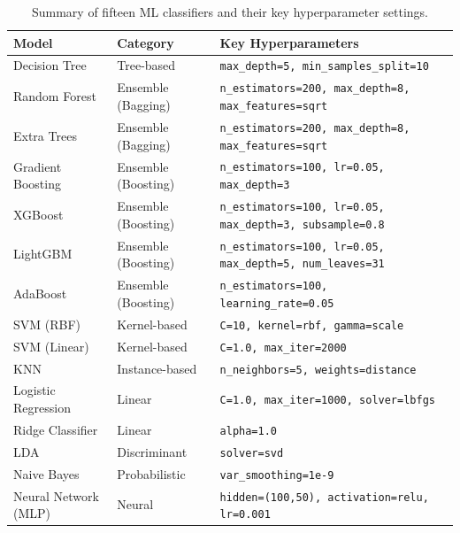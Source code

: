 \documentclass[12pt, oneside]{article} %
\begin{document}
\begin{table}[H]
\caption{Summary of fifteen ML classifiers and their key hyperparameter settings.}
\label{tab:classifiers}
\vspace{-4mm}
\begin{center}
\begin{tabular}{|>{\raggedright\arraybackslash}p{3.8cm}|>{\raggedright\arraybackslash}p{2.8cm}|>{\raggedright\arraybackslash}p{6.0cm}|}
\hline
\textbf{Model} & \textbf{Category} & \textbf{Key Hyperparameters} \\
\hline
Decision Tree & Tree-based & \texttt{max\_depth=5, min\_samples\_split=10} \\
\hline
Random Forest & Ensemble (Bagging) & \texttt{n\_estimators=200, max\_depth=8, max\_features=sqrt} \\
\hline
Extra Trees & Ensemble (Bagging) & \texttt{n\_estimators=200, max\_depth=8, max\_features=sqrt} \\
\hline
Gradient Boosting & Ensemble (Boosting) & \texttt{n\_estimators=100, lr=0.05, max\_depth=3} \\
\hline
XGBoost & Ensemble (Boosting) & \texttt{n\_estimators=100, lr=0.05, max\_depth=3, subsample=0.8} \\
\hline
LightGBM & Ensemble (Boosting) & \texttt{n\_estimators=100, lr=0.05, max\_depth=5, num\_leaves=31} \\
\hline
AdaBoost & Ensemble (Boosting) & \texttt{n\_estimators=100, learning\_rate=0.05} \\
\hline
SVM (RBF) & Kernel-based & \texttt{C=10, kernel=rbf, gamma=scale} \\
\hline
SVM (Linear) & Kernel-based & \texttt{C=1.0, max\_iter=2000} \\
\hline
KNN & Instance-based & \texttt{n\_neighbors=5, weights=distance} \\
\hline
Logistic Regression & Linear & \texttt{C=1.0, max\_iter=1000, solver=lbfgs} \\
\hline
Ridge Classifier & Linear & \texttt{alpha=1.0} \\
\hline
LDA & Discriminant & \texttt{solver=svd} \\
\hline
Naive Bayes & Probabilistic & \texttt{var\_smoothing=1e-9} \\
\hline
Neural Network (MLP) & Neural & \texttt{hidden=(100,50), activation=relu, lr=0.001} \\
\hline
\end{tabular}
\end{center}
\end{table}
\end{document}
